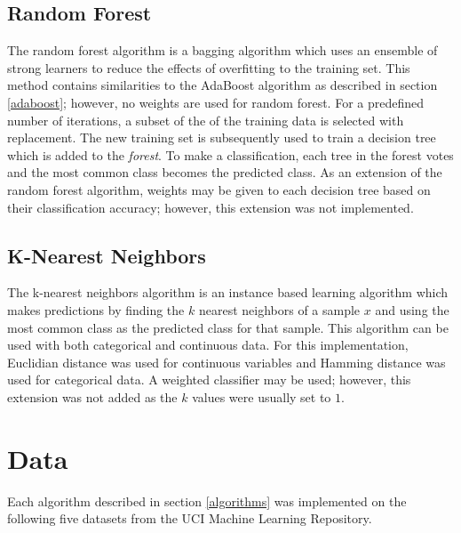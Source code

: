 \documentclass[11pt,titlepage]{article}
\newcommand{\ii}{\textit}
\begin{document}
\subsection{Random Forest}
The random forest algorithm is a bagging algorithm which uses an ensemble of strong learners to reduce the effects of overfitting to the training set. This method contains similarities to the AdaBoost algorithm as described in section \ref{adaboost}; however, no weights are used for random forest. For a predefined number of iterations, a subset of the of the training data is selected with replacement. The new training set is subsequently used to train a decision tree which is added to the \ii{forest}. To make a classification, each tree in the forest votes and the most common class becomes the predicted class. As an extension of the random forest algorithm, weights may be given to each decision tree based on their classification accuracy; however, this extension was not implemented.

\subsection{K-Nearest Neighbors}
The k-nearest neighbors algorithm is an instance based learning algorithm which makes predictions by finding the $k$ nearest neighbors of a sample $x$ and using the most common class as the predicted class for that sample. This algorithm can be used with both categorical and continuous data. For this implementation, Euclidian distance was used for continuous variables and Hamming distance was used for categorical data. A weighted classifier may be used; however, this extension was not added as the $k$ values were usually set to $1$.

\section{Data}
Each algorithm described in section \ref{algorithms} was implemented on the following five datasets from the UCI Machine Learning Repository.
\end{document}
